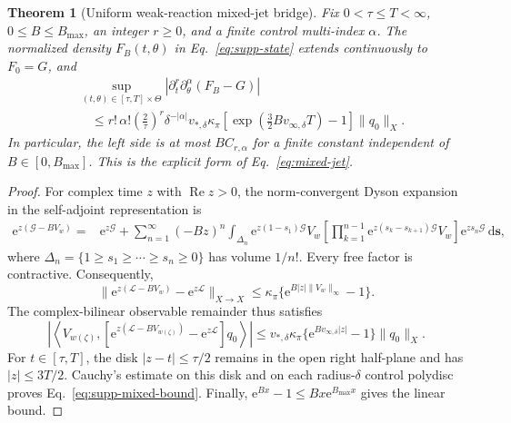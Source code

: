 \documentclass{iopjournal}
\newcommand{\dd}{\mathrm d}
\newcommand{\e}{\mathrm e}
\newcommand{\Lfree}{\mathcal L}
\theoremstyle{plain}
\newtheorem{theorem}{Theorem}
\theoremstyle{definition}
\begin{document}
\begin{theorem}[Uniform weak-reaction mixed-jet bridge]
\label{thm:mixed-jet}
Fix \(0<\tau\le T<\infty\), \(0\le B\le B_{\max}\), an integer \(r\ge0\),
and a finite control multi-index \(\alpha\).  The normalized density
\(F_B(t,\theta)\) in Eq.~\eqref{eq:supp-state} extends continuously to
\(F_0=G\), and
\begin{align}
 &\sup_{(t,\theta)\in[\tau,T]\times\Theta}
 \left|\partial_t^r\partial_\theta^\alpha(F_B-G)\right|
 \nonumber\\
 &\quad\le
 r!\,\alpha!\left(\frac2\tau\right)^r
 \delta^{-|\alpha|}v_{*,\delta}\kappa_\pi
 \left[\exp\!\left(\frac32Bv_{\infty,\delta}T\right)-1\right]
 \|q_0\|_X .
 \label{eq:supp-mixed-bound}
\end{align}
In particular, the left side is at most \(BC_{r,\alpha}\) for a finite
constant independent of \(B\in[0,B_{\max}]\).  This is the explicit form of
Eq.~\eqref{eq:mixed-jet}.
\end{theorem}

\begin{proof}
For complex time \(z\) with \(\operatorname{Re}z>0\), the
norm-convergent Dyson expansion in the self-adjoint representation is
\begin{align}
 \e^{z(\mathcal G-BV_w)}
 ={}&\e^{z\mathcal G}
 +\sum_{n=1}^{\infty}(-Bz)^n
 \int_{\Delta_n}\e^{z(1-s_1)\mathcal G}V_w
 \left[\prod_{k=1}^{n-1}
 \e^{z(s_k-s_{k+1})\mathcal G}V_w\right]
 \e^{zs_n\mathcal G}\,\dd\bm s ,
 \label{eq:supp-dyson}
\end{align}
where
\(\Delta_n=\{1\ge s_1\ge\cdots\ge s_n\ge0\}\) has volume \(1/n!\).
Every free factor is contractive.  Consequently,
\begin{equation}
 \|\e^{z(\Lfree-BV_w)}-\e^{z\Lfree}\|_{X\to X}
 \le\kappa_\pi\{\e^{B|z|\|V_w\|_\infty}-1\}.
 \label{eq:supp-operator-bound}
\end{equation}
The complex-bilinear observable remainder thus satisfies
\begin{equation}
 \left|\left\langle V_{w(\zeta)},
 [\e^{z(\Lfree-BV_{w(\zeta)})}-\e^{z\Lfree}]q_0
 \right\rangle\right|
 \le v_{*,\delta}\kappa_\pi
 \{\e^{Bv_{\infty,\delta}|z|}-1\}\|q_0\|_X .
 \label{eq:supp-remainder}
\end{equation}
For \(t\in[\tau,T]\), the disk \(|z-t|\le\tau/2\) remains in the open
right half-plane and has \(|z|\le3T/2\).  Cauchy's estimate on this disk and
on each radius-\(\delta\) control polydisc proves
Eq.~\eqref{eq:supp-mixed-bound}.  Finally,
\(\e^{Bx}-1\le Bx\e^{B_{\max}x}\) gives the linear bound.
\end{proof}
\end{document}
